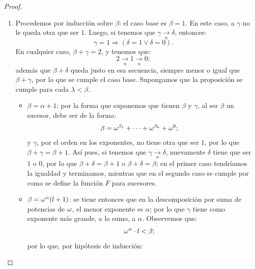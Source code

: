 \begin{proof}
\begin{enumerate}
            \[F(\beta,n)\underset{n}{\Rightarrow}F(\beta,j_1),\]
            es decir, existe $m_{j_1}$ tal que:
            \[F(\beta,j_1)=F(F(\beta,n),\underbrace{(n,\ldots,n)}_{m_{j_1}\text{-veces}})=F(\beta,\underbrace{(n,\ldots,n)}_{m_{j_1}+1\text{-veces}}).\]
            Aplicando el mismo proceso a $F(\beta,n)$ y a las expresiones resultantes con cada $j_i$, tenemos que:
            \[F(\beta,(j_1,\ldots,j_m))=F(\beta,\underbrace{(n,\ldots,n)}_{m_{j_1}+\cdots+m_{j_m}+1\text{-veces}}).\]
            Por lo tanto, tomando $k=m_{j_1}+\cdots+m_{j_m}+1$, tenemos:
            \[\alpha= F(\beta,\underbrace{(n,\ldots,n)}_{k\text{-veces}}).\]
            Esto es una contradicción, y por lo tanto, tenemos que:
            \[\beta\underset{n}{\not\rightarrow}\alpha.\]
            Esto termina el inciso.
        \item Procedemos por inducción sobre $\beta$:
            el caso base es $\beta=1$. En este caso, a $\gamma$ no le queda otra que ser $1$. Luego, si tenemos que $\gamma\underset{n}{\rightarrow}\delta$, entonces:
            \[\gamma=1\Longrightarrow(\delta=1\lor \delta=0).\]
            En cualquier caso, $\beta+\gamma=2$, y tenemos que:
            \[2\underset{n}{\rightarrow}1\underset{n}{\rightarrow}0;\]
            además que $\beta+\delta$ queda justo en esa secuencia, siempre menor o igual que $\beta+\gamma$, por lo que se cumple el caso base.
            Supongamos que la proposición se cumple para cada $\lambda<\beta$.
            \begin{itemize}
                \item $\beta=\alpha+1$: por la forma que suponemos que tienen $\beta$ y $\gamma$, al ser $\beta$ un sucesor, debe ser de la forma:
                    \[\beta=\omega^{\beta_1}+\cdots+\omega^{\beta_{k}}+\omega^{0};\]
                    y $\gamma$, por el orden en los exponentes, no tiene otra que ser $1$, por lo que $\beta+\gamma=\beta+1$. Así pues, si tenemos que $\gamma\underset{n}{\rightarrow}\delta$, nuevamente $\delta$ tiene que ser $1$ o $0$, por lo que $\beta+\delta=\beta+1$ o $\beta+\delta=\beta$; en el primer caso tendríamos la igualdad y terminamos, mientras que en el segundo caso se cumple por como se define la función $F$ para sucesores.
                \item $\beta=\omega^{\alpha}(l+1)$: se tiene entonces que en la descomposición por suma de potencias de $\omega$, el menor exponente es $\alpha$; por lo que $\gamma$ tiene como exponente más grande, a lo sumo, a $\alpha$. Observemos que:
                    \[\omega^\alpha\cdot l<\beta;\]
                    por lo que, por hipótesis de inducción:

\end{itemize}
\end{enumerate}
\end{proof}
